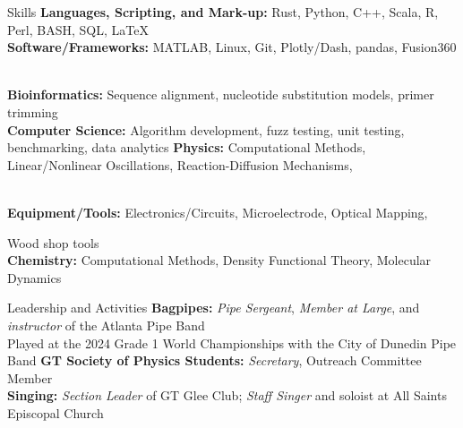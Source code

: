 \documentclass{resume} %
\begin{document}
\begin{rSection}{Skills}
\textbf{Languages, Scripting, and Mark-up:} Rust, Python, C++, Scala, R, Perl, BASH, SQL, LaTeX \\
\textbf{Software/Frameworks:} MATLAB, Linux, Git, Plotly/Dash, pandas, Fusion360 \\
\textbf{Bioinformatics:} Sequence alignment, nucleotide substitution models, primer trimming \\
\textbf{Computer Science:} Algorithm development, fuzz testing, unit testing, benchmarking, data analytics
\textbf{Physics:} Computational Methods, Linear/Nonlinear Oscillations, Reaction-Diffusion Mechanisms,\\
\textbf{Equipment/Tools:} Electronics/Circuits, Microelectrode, Optical Mapping, Wood shop tools\\
\textbf{Chemistry:} Computational Methods, Density Functional Theory, Molecular Dynamics 
\end{rSection}
\begin{rSection}{Leadership and Activities}
\textbf{Bagpipes:} \textit{Pipe Sergeant}, \textit{Member at Large}, and \textit{instructor} of the Atlanta Pipe Band \\
\-\hspace{2cm} Played at the 2024 Grade 1 World Championships with the City of Dunedin Pipe Band
\textbf{GT Society of Physics Students:} \textit{Secretary}, Outreach Committee Member \\
\textbf{Singing:} \textit{Section Leader} of GT Glee Club; \textit{Staff Singer} and soloist at All Saints Episcopal Church  \\



\end{rSection}
\end{document}
